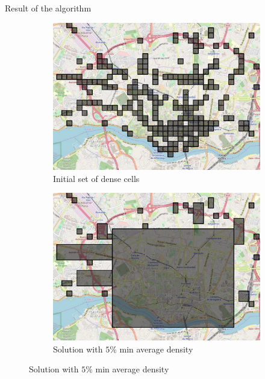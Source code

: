 \documentclass[10pt]{beamer}
\begin{document}

\begin{frame}{Result of the algorithm}
\begin{figure}
    \begin{subfigure}{0.49\textwidth}
        \includegraphics[scale=0.2]{figures/map/grid-init.pdf}
        \caption{Initial set of dense cells}
    \end{subfigure}
    \begin{subfigure}{0.49\textwidth}
        \includegraphics[scale=0.2]{figures/map/grid-pp.pdf}
        \caption{Solution with $5\%$ min average density}
    \end{subfigure}
\end{figure}
\end{frame}
\end{document}
